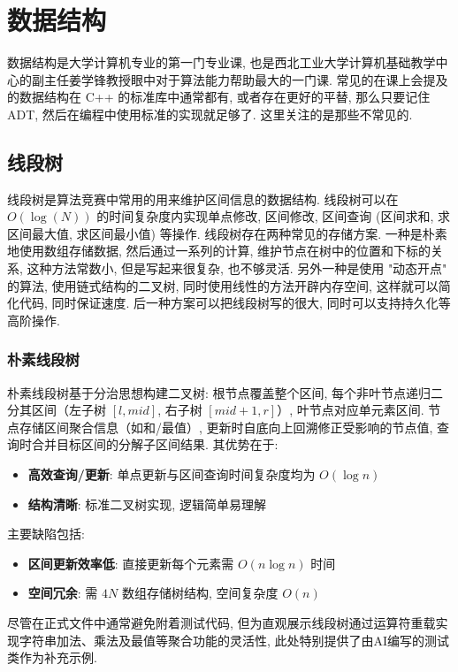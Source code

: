 \documentclass[a4paper]{ctexart}
\begin{document}
\section{数据结构}

数据结构是大学计算机专业的第一门专业课, 也是西北工业大学计算机基础教学中心的副主任姜学锋教授眼中对于算法能力帮助最大的一门课. 常见的在课上会提及的数据结构在 C++ 的标准库中通常都有, 或者存在更好的平替, 那么只要记住 ADT, 然后在编程中使用标准的实现就足够了. 这里关注的是那些不常见的.

\subsection{线段树}

线段树是算法竞赛中常用的用来维护区间信息的数据结构. 线段树可以在 $O(\log(N))$ 的时间复杂度内实现单点修改, 区间修改, 区间查询 (区间求和, 求区间最大值, 求区间最小值) 等操作. 线段树存在两种常见的存储方案. 一种是朴素地使用数组存储数据, 然后通过一系列的计算, 维护节点在树中的位置和下标的关系, 这种方法常数小, 但是写起来很复杂, 也不够灵活. 另外一种是使用 "动态开点" 的算法, 使用链式结构的二叉树, 同时使用线性的方法开辟内存空间, 这样就可以简化代码, 同时保证速度. 后一种方案可以把线段树写的很大, 同时可以支持持久化等高阶操作.

\subsubsection*{朴素线段树}

朴素线段树基于分治思想构建二叉树: 根节点覆盖整个区间, 每个非叶节点递归二分其区间（左子树 $[l, mid]$, 右子树 $[mid+1, r]$）, 叶节点对应单元素区间. 节点存储区间聚合信息（如和/最值）, 更新时自底向上回溯修正受影响的节点值, 查询时合并目标区间的分解子区间结果. 其优势在于: 
\begin{itemize}
	\item \textbf{高效查询/更新}: 单点更新与区间查询时间复杂度均为 $O(\log n)$
	\item \textbf{结构清晰}: 标准二叉树实现, 逻辑简单易理解
\end{itemize}
主要缺陷包括: 
\begin{itemize}
	\item \textbf{区间更新效率低}: 直接更新每个元素需 $O(n \log n)$ 时间
	\item \textbf{空间冗余}: 需 $4N$ 数组存储树结构, 空间复杂度 $O(n)$
\end{itemize}

尽管在正式文件中通常避免附着测试代码, 但为直观展示线段树通过运算符重载实现字符串加法、乘法及最值等聚合功能的灵活性, 此处特别提供了由AI编写的测试类作为补充示例. 
\end{document}
